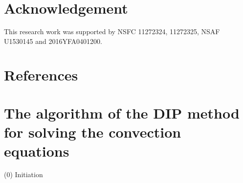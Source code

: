 \documentclass[review]{elsarticle}
\theoremstyle{plain}\newtheorem{definition}{\sc{Definition}}
\theoremstyle{defination}\newtheorem{example}{Example}[section]
\numberwithin{equation}{section}
\numberwithin{table}{section}
\begin{document}
{%

\section*{Acknowledgement} 
This research work was supported by NSFC 11272324, 11272325, NSAF U1530145 and 2016YFA0401200.

\section*{References}



\newpage
  \appendix
  \renewcommand{\appendixname}{Appendix~}

  \section{The algorithm of the DIP method for solving the convection equations}
\large {\color{black!60!red!80!}}
  \color{black}

\hspace{-0.48cm}
\normalsize
(0) Initiation 
\vspace{0.1cm}

}
\end{document}
